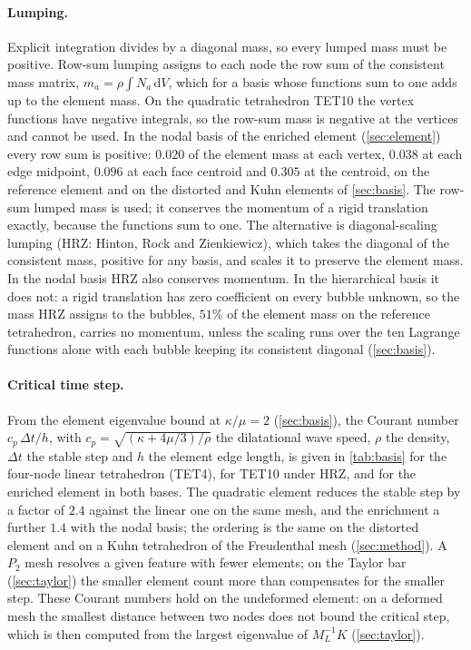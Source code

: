 \documentclass{article}
\newcommand{\diff}{\,\mathrm{d}}
\theoremstyle{definition}
\theoremstyle{plain}
\begin{document}
\paragraph{Lumping.} Explicit integration divides by a diagonal mass, so
every lumped mass must be positive. Row-sum lumping assigns to each node
the row sum of the consistent mass matrix, $m_a = \rho \int N_a \diff V$,
which for a basis whose functions sum to one adds up to the element mass.
On the quadratic tetrahedron
TET10 the vertex functions have negative integrals, so the
row-sum mass is negative at the vertices and cannot be used. In the nodal
basis of the enriched element (\cref{sec:element}) every row sum is
positive: $0.020$ of the element mass at each vertex, $0.038$ at each edge
midpoint, $0.096$ at each face centroid and $0.305$ at the centroid, on the
reference element and on the distorted and Kuhn elements of
\cref{sec:basis}. The row-sum lumped mass is used; it conserves the
momentum of a rigid translation exactly, because the functions sum to one.
The alternative is diagonal-scaling lumping \cite{HintonRockZienkiewicz:1976}
(HRZ: Hinton, Rock and Zienkiewicz), which takes the diagonal of the
consistent mass, positive for any basis, and scales it to preserve the
element mass. In the nodal basis HRZ also conserves momentum. In the
hierarchical basis it does not: a rigid translation has zero coefficient on
every bubble unknown, so the mass HRZ assigns to the bubbles, $51\%$ of the
element mass on the reference tetrahedron, carries no momentum, unless the
scaling runs over the ten Lagrange functions alone with each bubble keeping
its consistent diagonal (\cref{sec:basis}).

\paragraph{Critical time step.} From the element eigenvalue bound at
$\kappa/\mu = 2$ (\cref{sec:basis}), the Courant number $c_p\,\Delta t/h$,
with $c_p = \sqrt{(\kappa + 4\mu/3)/\rho}$ the dilatational wave speed,
$\rho$ the density, $\Delta t$ the stable step and $h$ the element edge
length, is given in \cref{tab:basis} for the four-node linear
tetrahedron (TET4), for TET10 under HRZ, and for the
enriched element in both bases. The quadratic element reduces the stable step
by a factor of $2.4$ against the linear one on the same mesh, and the
enrichment a further $1.4$ with the nodal basis; the ordering is the same on
the distorted element and on a Kuhn tetrahedron of the Freudenthal mesh
(\cref{sec:method}). A $P_2$ mesh resolves a given feature with fewer
elements; on the Taylor bar (\cref{sec:taylor}) the smaller element count
more than compensates for the smaller step. These Courant numbers hold on
the undeformed element: on a deformed mesh the smallest distance between
two nodes does not bound the critical step, which is then computed from
the largest eigenvalue of $M_L^{-1}K$ (\cref{sec:taylor}).
\end{document}
